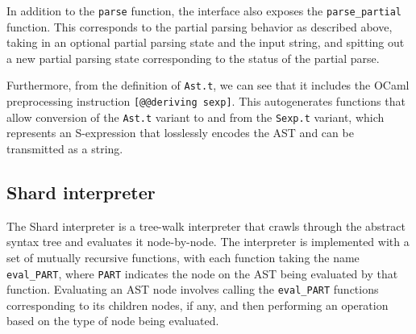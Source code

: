\documentclass[twoside]{report}
\begin{document}
In addition to the \texttt{parse} function, the interface also exposes the \texttt{parse\_partial} function. This corresponds to the partial parsing behavior as described above, taking in an optional partial parsing state and the input string, and spitting out a new partial parsing state corresponding to the status of the partial parse.

Furthermore, from the definition of \texttt{Ast.t}, we can see that it includes the OCaml preprocessing instruction \texttt{[@@deriving sexp]}. This autogenerates functions that allow conversion of the \texttt{Ast.t} variant to and from the \texttt{Sexp.t} variant, which represents an S-expression that losslessly encodes the AST and can be transmitted as a string.

\subsection{Shard interpreter}

The Shard interpreter is a tree-walk interpreter that crawls through the abstract syntax tree and evaluates it node-by-node.
The interpreter is implemented with a set of mutually recursive functions, with each function taking the name \texttt{eval\_PART}, where \texttt{PART} indicates the node on the AST being evaluated by that function.
Evaluating an AST node involves calling the \texttt{eval\_PART} functions corresponding to its children nodes, if any, and then performing an operation based on the type of node being evaluated.





\end{document}
